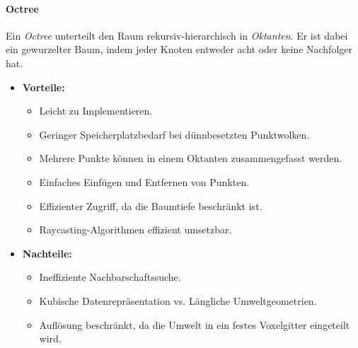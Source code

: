 \documentclass[a4paper, 11pt, accentcolor = tud3b]{tudreport}
\begin{document}
					\paragraph{Octree}
						Ein \emph{Octree} unterteilt den Raum rekursiv-hierarchisch in \emph{Oktanten}. Er ist dabei ein gewurzelter Baum, indem jeder Knoten entweder acht oder keine Nachfolger hat.
						
						\begin{itemize}
							\item \textbf{Vorteile:}
								\begin{itemize}
									\item Leicht zu Implementieren.
									\item Geringer Speicherplatzbedarf bei dünnbesetzten Punktwolken.
									\item Mehrere Punkte können in einem Oktanten zusammengefasst werden.
									\item Einfaches Einfügen und Entfernen von Punkten.
									\item Effizienter Zugriff, da die Baumtiefe beschränkt ist.
									\item Raycasting-Algorithmen effizient umsetzbar.
								\end{itemize}
							\item \textbf{Nachteile:}
								\begin{itemize}
									\item Ineffiziente Nachbarschaftssuche.
									\item Kubische Datenrepräsentation vs. Längliche Umweltgeometrien.
									\item Auflösung beschränkt, da die Umwelt in ein festes Voxelgitter eingeteilt wird.
								\end{itemize}
						\end{itemize}
\end{document}
